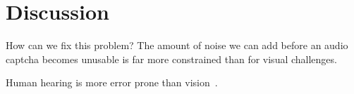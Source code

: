 \section{Discussion}
\label{sec:discussion}

How can we fix this problem? The amount of noise we can add before an audio captcha becomes unusable is 
far more constrained than for visual challenges.

Human hearing is more error prone than vision~\cite{o2009auditory,shinn2008object}.
